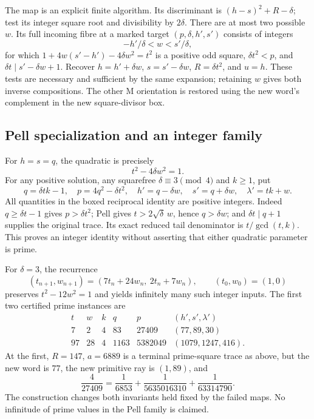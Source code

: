 \documentclass[10pt,reqno]{amsart}
\begin{document}
The map is an explicit finite algorithm. Its discriminant is
$(h-s)^2+R-\delta$; test its integer square root and divisibility by
$2\delta$. There are at most two possible $w$.
Its full incoming fibre at a marked target $(p,\delta,h',s')$ consists of
integers
\[
 -h'/\delta<w<s'/\delta,
\]
for which $1+4w(s'-h')-4\delta w^2=t^2$ is a positive odd square,
$\delta t^2<p$, and $\delta t\mid s'-\delta w+1$.
Recover $h=h'+\delta w$, $s=s'-\delta w$, $R=\delta t^2$, and $u=h$.
These tests are necessary and sufficient by the same expansion; retaining
$w$ gives both inverse compositions. The other M orientation is restored
using the new word's complement in the new square-divisor box.

\subsection*{Pell specialization and an integer family}
For $h=s=q$, the quadratic is precisely
\[
 t^2-4\delta w^2=1.
\]
For any positive solution, any squarefree $\delta\equiv3\pmod4$ and $k\ge1$,
put
\[
 q=\delta tk-1,\quad p=4q^2-\delta t^2,
 \quad h'=q-\delta w,\quad s'=q+\delta w,\quad\lambda'=tk+w.
\]
All quantities in the boxed reciprocal identity are positive integers.
Indeed $q\ge\delta t-1$ gives $p>\delta t^2$; Pell gives
$t>2\sqrt\delta\,w$, hence $q>\delta w$; and
$\delta t\mid q+1$ supplies the original trace.
Its exact reduced tail denominator is $t/\gcd(t,k)$.
This proves an integer identity without asserting that either quadratic
parameter is prime.

For $\delta=3$, the recurrence
\[
 (t_{n+1},w_{n+1})=(7t_n+24w_n,\ 2t_n+7w_n),\qquad(t_0,w_0)=(1,0)
\]
preserves $t^2-12w^2=1$ and yields infinitely many such integer inputs.
The first two certified prime instances are
\[
\begin{array}{r|r|r|r|r|r}
t&w&k&q&p&(h',s',\lambda')\\\hline
7&2&4&83&27409&(77,89,30)\\
97&28&4&1163&5382049&(1079,1247,416).
\end{array}
\]
At the first, $R=147$, $a=6889$ is a terminal prime-square trace as above,
but the new word is $77$, the new primitive ray is $(1,89)$, and
\[
 \frac4{27409}=\frac1{6853}+\frac1{5635016310}+\frac1{63314790}.
\]
The construction changes both invariants held fixed by the failed maps.
No infinitude of prime values in the Pell family is claimed.


\end{document}
